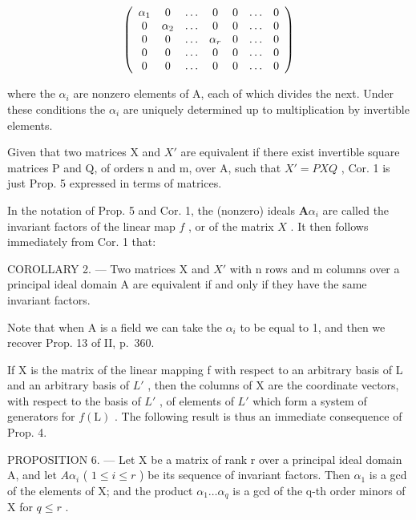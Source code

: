 \[
\left( \begin{array}{c c c c c c c} \alpha_ {1} & 0 & \ldots & 0 & 0 & \ldots & 0 \\ 0 & \alpha_ {2} & \ldots & 0 & 0 & \ldots & 0 \\ 0 & 0 & \ldots & \alpha_ {r} & 0 & \ldots & 0 \\ 0 & 0 & \ldots & 0 & 0 & \ldots & 0 \\ 0 & 0 & \ldots & 0 & 0 & \ldots & 0 \end{array} \right)
\]

where the \(\alpha_{i}\) are nonzero elements of A, each of which divides the next. Under these conditions the \(\alpha_{i}\) are uniquely determined up to multiplication by invertible elements.

Given that two matrices X and \(X'\) are equivalent if there exist invertible square matrices P and Q, of orders n and m, over A, such that \(X' = PXQ\) , Cor. 1 is just Prop. 5 expressed in terms of matrices.

In the notation of Prop. 5 and Cor. 1, the (nonzero) ideals \(\mathbf{A}\alpha_{i}\) are called the invariant factors of the linear map \(f\) , or of the matrix \(X\) . It then follows immediately from Cor. 1 that:

COROLLARY 2. --- Two matrices X and \(X'\) with n rows and m columns over a principal ideal domain A are equivalent if and only if they have the same invariant factors.

Note that when A is a field we can take the \(\alpha_{i}\) to be equal to 1, and then we recover Prop. 13 of II, p.~360.

If X is the matrix of the linear mapping f with respect to an arbitrary basis of L and an arbitrary basis of \(L'\) , then the columns of X are the coordinate vectors, with respect to the basis of \(L'\) , of elements of \(L'\) which form a system of generators for \(f(\mathrm{L})\) . The following result is thus an immediate consequence of Prop. 4.

PROPOSITION 6. --- Let X be a matrix of rank r over a principal ideal domain A, and let \(A\alpha_{i}\) ( \(1 \leqslant i \leqslant r\) ) be its sequence of invariant factors. Then \(\alpha_{1}\) is a gcd of the elements of X; and the product \(\alpha_{1} \ldots \alpha_{q}\) is a gcd of the q-th order minors of X for \(q \leqslant r\) .

